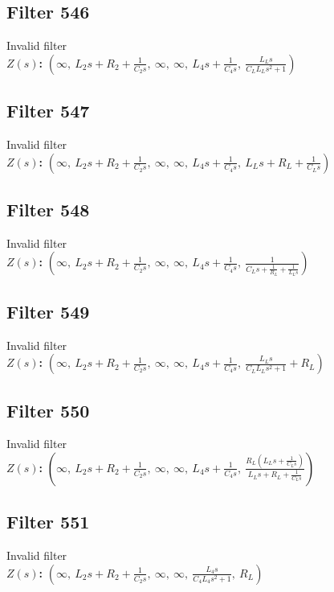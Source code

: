 \documentclass{article}
\begin{document}
\subsection*{Filter 546}
Invalid filter \\ 
\textbf{$Z(s)$:} $\left( \infty, \  L_{2} s + R_{2} + \frac{1}{C_{2} s}, \  \infty, \  \infty, \  L_{4} s + \frac{1}{C_{4} s}, \  \frac{L_{L} s}{C_{L} L_{L} s^{2} + 1}\right)$ \\ 
\subsection*{Filter 547}
Invalid filter \\ 
\textbf{$Z(s)$:} $\left( \infty, \  L_{2} s + R_{2} + \frac{1}{C_{2} s}, \  \infty, \  \infty, \  L_{4} s + \frac{1}{C_{4} s}, \  L_{L} s + R_{L} + \frac{1}{C_{L} s}\right)$ \\ 
\subsection*{Filter 548}
Invalid filter \\ 
\textbf{$Z(s)$:} $\left( \infty, \  L_{2} s + R_{2} + \frac{1}{C_{2} s}, \  \infty, \  \infty, \  L_{4} s + \frac{1}{C_{4} s}, \  \frac{1}{C_{L} s + \frac{1}{R_{L}} + \frac{1}{L_{L} s}}\right)$ \\ 
\subsection*{Filter 549}
Invalid filter \\ 
\textbf{$Z(s)$:} $\left( \infty, \  L_{2} s + R_{2} + \frac{1}{C_{2} s}, \  \infty, \  \infty, \  L_{4} s + \frac{1}{C_{4} s}, \  \frac{L_{L} s}{C_{L} L_{L} s^{2} + 1} + R_{L}\right)$ \\ 
\subsection*{Filter 550}
Invalid filter \\ 
\textbf{$Z(s)$:} $\left( \infty, \  L_{2} s + R_{2} + \frac{1}{C_{2} s}, \  \infty, \  \infty, \  L_{4} s + \frac{1}{C_{4} s}, \  \frac{R_{L} \left(L_{L} s + \frac{1}{C_{L} s}\right)}{L_{L} s + R_{L} + \frac{1}{C_{L} s}}\right)$ \\ 
\subsection*{Filter 551}
Invalid filter \\ 
\textbf{$Z(s)$:} $\left( \infty, \  L_{2} s + R_{2} + \frac{1}{C_{2} s}, \  \infty, \  \infty, \  \frac{L_{4} s}{C_{4} L_{4} s^{2} + 1}, \  R_{L}\right)$ \\ 
\end{document}
